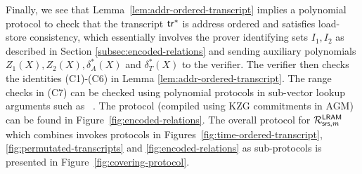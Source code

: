 Finally, we see that Lemma~\ref{lem:addr-ordered-transcript} implies a polynomial protocol to check that the transcript
$\mathsf{tr}^\ast$ is address ordered and satisfies load-store consistency, which
essentially involves the prover identifying sets
$I_1, I_2$ as described in Section \ref{subsec:encoded-relations} and sending auxiliary polynomials $Z_1(X),Z_2(X),\delta^\ast_A(X)$ and $\delta^\ast_T(X)$ to the verifier.
The verifier then checks the identities (C1)-(C6) in Lemma \ref{lem:addr-ordered-transcript}.
The range checks in (C7) can be checked using polynomial protocols in sub-vector lookup arguments such as
~\cite{EPRINT:PosKat22,EPRINT:EagFioGab22,PKC:CFFLL24,PKC:ZSG24}.
The protocol (compiled using KZG commitments in AGM) can be found in Figure~\ref{fig:encoded-relations}.
The overall protocol for $\mathcal{R}^{\mathsf{LRAM}}_{\mathsf{srs},m}$ which combines invokes protocols in Figures~\ref{fig:time-ordered-transcript},\ref{fig:permutated-transcripts}
and \ref{fig:encoded-relations} as sub-protocols is presented in Figure~\ref{fig:covering-protocol}.
